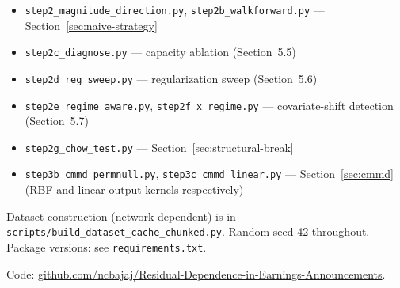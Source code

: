 \documentclass[11pt]{article}
\begin{document}
\begin{itemize}
  \item \texttt{step2\_magnitude\_direction.py}, \texttt{step2b\_walkforward.py} --- Section~\ref{sec:naive-strategy}
  \item \texttt{step2c\_diagnose.py} --- capacity ablation (Section~5.5)
  \item \texttt{step2d\_reg\_sweep.py} --- regularization sweep (Section~5.6)
  \item \texttt{step2e\_regime\_aware.py}, \texttt{step2f\_x\_regime.py} --- covariate-shift detection (Section~5.7)
  \item \texttt{step2g\_chow\_test.py} --- Section~\ref{sec:structural-break}
  \item \texttt{step3b\_cmmd\_permnull.py}, \texttt{step3c\_cmmd\_linear.py} --- Section~\ref{sec:cmmd} (RBF and linear output kernels respectively)
\end{itemize}

Dataset construction (network-dependent) is in \texttt{scripts/build\_dataset\_cache\_chunked.py}. Random seed 42 throughout. Package versions: see \texttt{requirements.txt}.

Code: \href{https://github.com/ncbajaj/Residual-Dependence-in-Earnings-Announcements-Empirical-Estimation-of-I-X-Y-Z-}{github.com/ncbajaj/Residual-Dependence-in-Earnings-Announcements}.
\end{document}
